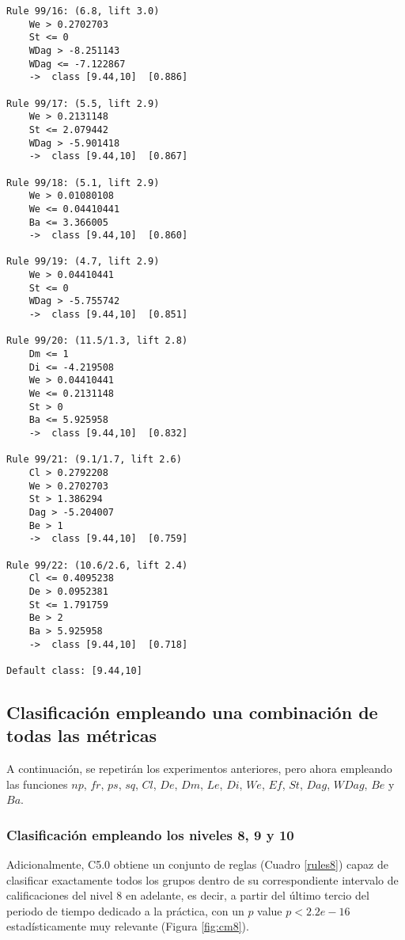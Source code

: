 \begin{tcolorbox}[title=Reglas de clasificación para identificar intervalos de notas.]
\begin{multicols}{3}
\begin{verbatim}
Rule 99/16: (6.8, lift 3.0)
	We > 0.2702703
	St <= 0
	WDag > -8.251143
	WDag <= -7.122867
	->  class [9.44,10]  [0.886]

Rule 99/17: (5.5, lift 2.9)
	We > 0.2131148
	St <= 2.079442
	WDag > -5.901418
	->  class [9.44,10]  [0.867]

Rule 99/18: (5.1, lift 2.9)
	We > 0.01080108
	We <= 0.04410441
	Ba <= 3.366005
	->  class [9.44,10]  [0.860]

Rule 99/19: (4.7, lift 2.9)
	We > 0.04410441
	St <= 0
	WDag > -5.755742
	->  class [9.44,10]  [0.851]

Rule 99/20: (11.5/1.3, lift 2.8)
	Dm <= 1
	Di <= -4.219508
	We > 0.04410441
	We <= 0.2131148
	St > 0
	Ba <= 5.925958
	->  class [9.44,10]  [0.832]

Rule 99/21: (9.1/1.7, lift 2.6)
	Cl > 0.2792208
	We > 0.2702703
	St > 1.386294
	Dag > -5.204007
	Be > 1
	->  class [9.44,10]  [0.759]

Rule 99/22: (10.6/2.6, lift 2.4)
	Cl <= 0.4095238
	De > 0.0952381
	St <= 1.791759
	Be > 2
	Ba > 5.925958
	->  class [9.44,10]  [0.718]

Default class: [9.44,10]
    \end{verbatim}
  \end{multicols}
\label{rules5}
\end{tcolorbox}

\subsection{Clasificación empleando una combinación de todas las métricas}

A continuación, se repetirán los experimentos anteriores, pero ahora empleando las funciones $np$, $fr$, $ps$, $sq$, $Cl$, $De$, $Dm$, $Le$, $Di$, $We$, $Ef$, $St$, $Dag$, $WDag$, $Be$ y $Ba$.

\subsubsection{Clasificación empleando los niveles 8, 9 y 10}

Adicionalmente, C5.0 obtiene un conjunto de reglas (Cuadro \ref{rules8}) capaz de clasificar exactamente todos los grupos dentro de su correspondiente intervalo de calificaciones del nivel $8$ en adelante, es decir, a partir del último tercio del periodo de tiempo dedicado a la práctica, con un $p$ value $p < 2.2e-16$ estadísticamente muy relevante (Figura \ref{fig:cm8}).

